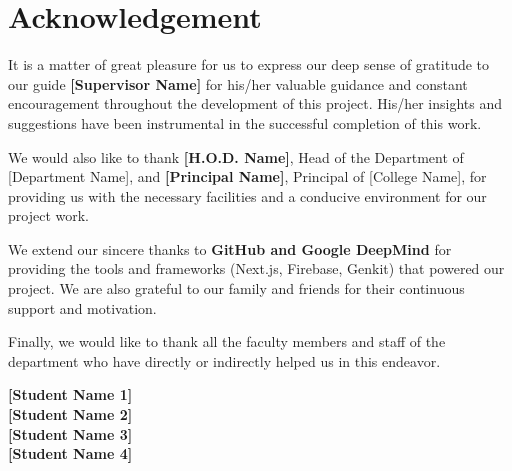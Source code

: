 \chapter*{Acknowledgement}
\thispagestyle{roman}

It is a matter of great pleasure for us to express our deep sense of gratitude to our guide \textbf{[Supervisor Name]} for his/her valuable guidance and constant encouragement throughout the development of this project. His/her insights and suggestions have been instrumental in the successful completion of this work.

We would also like to thank \textbf{[H.O.D. Name]}, Head of the Department of [Department Name], and \textbf{[Principal Name]}, Principal of [College Name], for providing us with the necessary facilities and a conducive environment for our project work.

We extend our sincere thanks to \textbf{GitHub and Google DeepMind} for providing the tools and frameworks (Next.js, Firebase, Genkit) that powered our project. We are also grateful to our family and friends for their continuous support and motivation.

Finally, we would like to thank all the faculty members and staff of the department who have directly or indirectly helped us in this endeavor.

\vspace{2cm}

\begin{flushright}
    \textbf{[Student Name 1]} \\
    \textbf{[Student Name 2]} \\
    \textbf{[Student Name 3]} \\
    \textbf{[Student Name 4]} 
\end{flushright}
\newpage
